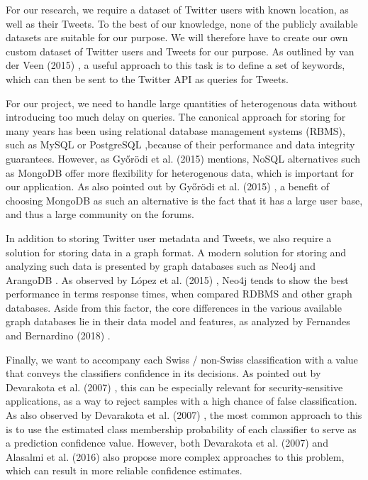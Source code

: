 \documentclass[10pt,a4paper]{article}
\begin{document}
For our research, we require a dataset of Twitter users with known location, as well as their Tweets. To the best of our knowledge, none of the publicly available datasets are suitable for our purpose. We will therefore have to create our own custom dataset of Twitter users and Tweets for our purpose. As outlined by van der Veen (2015) \cite{vand15a}, a useful approach to this task is to define a set of keywords, which can then be sent to the Twitter API as queries for Tweets.

For our project, we need to handle large quantities of heterogenous data without introducing too much delay on queries. The canonical approach for storing for many years has been using relational database management systems (RBMS), such as MySQL \cite{mysq15a} or PostgreSQL \cite{ston95a},because of their performance and data integrity guarantees. However, as Győrödi et al. (2015) \cite{gyor15a} mentions, NoSQL alternatives such as MongoDB offer more flexibility for heterogenous data, which is important for our application. As also pointed out by Győrödi et al. (2015) \cite{gyor15a}, a benefit of choosing MongoDB as such an alternative is the fact that it has a large user base, and thus a large community on the forums. 

In addition to storing Twitter user metadata and Tweets, we also require a solution for storing data in a graph format. A modern solution for storing and analyzing such data is presented by graph databases such as Neo4j and ArangoDB \cite{best19a}. As observed by López et al. (2015) \cite{lope15a}, Neo4j tends to show the best performance in terms response times, when compared RDBMS and other graph databases. Aside from this factor, the core differences in the various available graph databases lie in their data model and features, as analyzed by Fernandes and Bernardino (2018) \cite{fern18a}.

Finally, we want to accompany each Swiss / non-Swiss classification with a value that conveys the classifiers confidence in its decisions. As pointed out by Devarakota et al. (2007) \cite{deva07a}, this can be especially relevant for security-sensitive applications, as a way to reject samples with a high chance of false classification. As also observed by Devarakota et al. (2007) \cite{deva07a}, the most common approach to this is to use the estimated class membership probability of each classifier to serve as a prediction confidence value. However, both Devarakota et al. (2007) \cite{deva07a} and Alasalmi et al. (2016) \cite{alsa16a} also propose more complex approaches to this problem, which can result in more reliable confidence estimates.
\end{document}
